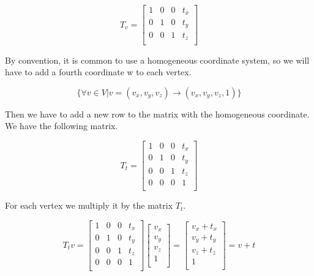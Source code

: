 \documentclass[titlepage,12pt]{report}
\begin{document}
\begin{equation}
T_v = 
\begin{bmatrix}
1 & 0 & 0 & t_x \\
0 & 1 & 0 & t_y \\
0 & 0 & 1 & t_z \\
\end{bmatrix}
\end{equation}

By convention, it is common to use a homogeneous coordinate system, so we will have to add a fourth coordinate w to each vertex.

\begin{equation}
\{\forall v \in V | v = (v_x, v_y, v_z) \rightarrow (v_x, v_y, v_z, 1)\}
\end{equation}

Then we have to add a new row to the matrix with the homogeneous coordinate. We have the following matrix.

\begin{equation}
T_t = 
\begin{bmatrix}
1 & 0 & 0 & t_x \\
0 & 1 & 0 & t_y \\
0 & 0 & 1 & t_z \\
0 & 0 & 0 & 1 \\
\end{bmatrix}
\end{equation}

For each vertex we multiply it by the matrix $T_t$.

\begin{equation}\label{translate}
T_t v = 
\begin{bmatrix}
1 & 0 & 0 & t_x \\
0 & 1 & 0 & t_y \\
0 & 0 & 1 & t_z \\
0 & 0 & 0 & 1 \\
\end{bmatrix}
\begin{bmatrix}
v_x \\
v_y \\
v_z \\
1 \\
\end{bmatrix}
=
\begin{bmatrix}
v_x + t_x \\
v_y + t_y \\
v_z + t_z \\
1 \\
\end{bmatrix}
= v + t
\end{equation}
\end{document}
